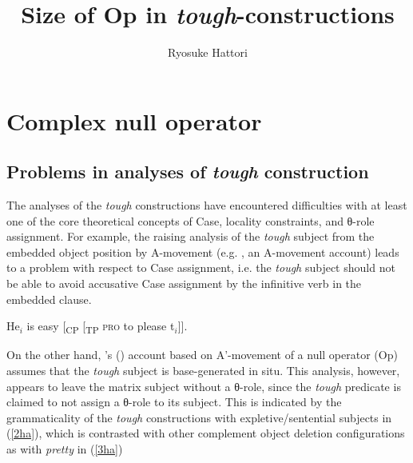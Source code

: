 \documentclass[output=paper,colorlinks,citecolor=brown,
]{langscibook}
\author{Ryosuke Hattori \affiliation{Kobe Gakuin University}}
\title{Size of Op in \textit{tough}-constructions}
\begin{document}
\maketitle

\section{Complex null operator}
\subsection{Problems in analyses of \textit{tough} construction}
The analyses of the \textit{tough} constructions have encountered difficulties with at least one of the core theoretical concepts of Case, locality constraints, and θ-role assignment. For example, the raising analysis of the \textit{tough} subject from the embedded object position by A-movement (e.g. \citeauthor{Rosenbaum1967} \citeyear{Rosenbaum1967}, an A-movement account) leads to a problem with respect to Case assignment, i.e. the \textit{tough} subject should not be able to avoid accusative Case assignment by the infinitive verb in the embedded clause.

\begin{exe}
\ex \label{1ha}
He$_{i}$ is easy [\textsubscript{CP} [\textsubscript{TP} \textsc{pro} to please t$_{i}$]].
\end{exe}

On the other hand, \citeauthor{Chomsky1977}'s (\citeyear{Chomsky1977}) account based on A'-movement of a null operator (Op) assumes that the \textit{tough} subject is base-generated in situ. This analysis, however, appears to leave the matrix subject without a θ-role, since the \textit{tough} predicate is claimed to not assign a θ-role to its subject. This is indicated by the grammaticality of the \textit{tough} constructions with expletive/sentential subjects in (\ref{2ha}), which is contrasted with other complement object deletion configurations as with \textit{pretty} in (\ref{3ha}) 

\begin{exe}
\ex \label{2ha}
\begin{xlist}
\end{xlist}
\ex \label{3ha}
\begin{xlist}
\end{xlist}
\end{exe}
\end{document}
